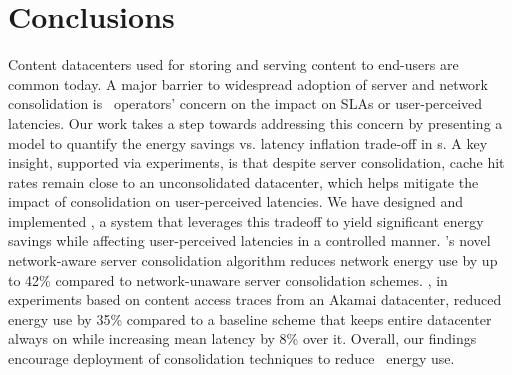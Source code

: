 \section{Conclusions}
Content datacenters used for storing and serving content to end-users are common today. A major barrier to  widespread adoption of server and network consolidation is \cdc\ operators' concern on the impact on SLAs or user-perceived latencies. Our work takes a step towards addressing this concern by presenting a model to quantify the energy savings vs. latency inflation trade-off in \cdc s.  A key insight, supported via experiments, is that despite server consolidation, cache hit rates remain close to an unconsolidated datacenter,  which helps mitigate the impact of consolidation on user-perceived latencies. We have designed and implemented \shrink, a system that leverages this tradeoff to yield significant energy savings while affecting user-perceived latencies in a controlled manner. \shrink's novel network-aware server consolidation algorithm reduces network energy use by up to 42\% compared to network-unaware server consolidation schemes. \shrink, in experiments based on content access traces from an Akamai datacenter, reduced energy use by 35\% compared to a baseline scheme that keeps entire datacenter always on while increasing mean latency by 8\% over it. Overall, our findings encourage deployment of consolidation techniques to reduce \cdc\ energy use.
